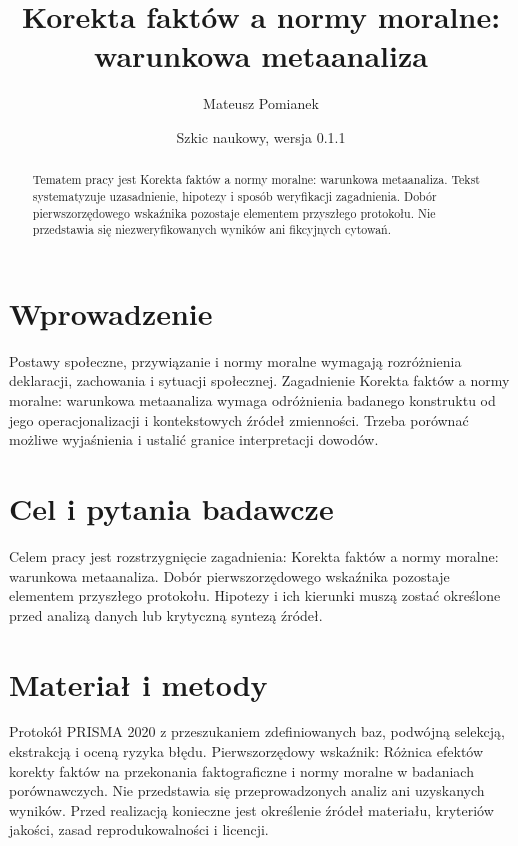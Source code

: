 \documentclass[11pt,a4paper]{article}
\title{Korekta faktów a normy moralne: warunkowa metaanaliza}
\author{Mateusz Pomianek}
\date{Szkic naukowy, wersja 0.1.1}
\begin{document}
\maketitle

\begin{abstract}

Tematem pracy jest Korekta faktów a normy moralne: warunkowa metaanaliza. Tekst systematyzuje uzasadnienie, hipotezy i sposób weryfikacji zagadnienia. Dobór pierwszorzędowego wskaźnika pozostaje elementem przyszłego protokołu. Nie przedstawia się niezweryfikowanych wyników ani fikcyjnych cytowań.

\end{abstract}

\section{Wprowadzenie}

Postawy społeczne, przywiązanie i normy moralne wymagają rozróżnienia deklaracji, zachowania i sytuacji społecznej. Zagadnienie Korekta faktów a normy moralne: warunkowa metaanaliza wymaga odróżnienia badanego konstruktu od jego operacjonalizacji i kontekstowych źródeł zmienności. Trzeba porównać możliwe wyjaśnienia i ustalić granice interpretacji dowodów.

\section{Cel i pytania badawcze}

Celem pracy jest rozstrzygnięcie zagadnienia: Korekta faktów a normy moralne: warunkowa metaanaliza. Dobór pierwszorzędowego wskaźnika pozostaje elementem przyszłego protokołu. Hipotezy i ich kierunki muszą zostać określone przed analizą danych lub krytyczną syntezą źródeł.

\section{Materiał i metody}

Protokół PRISMA 2020 z przeszukaniem zdefiniowanych baz, podwójną selekcją, ekstrakcją i oceną ryzyka błędu. Pierwszorzędowy wskaźnik: Różnica efektów korekty faktów na przekonania faktograficzne i normy moralne w badaniach porównawczych. Nie przedstawia się przeprowadzonych analiz ani uzyskanych wyników. Przed realizacją konieczne jest określenie źródeł materiału, kryteriów jakości, zasad reprodukowalności i licencji.
\end{document}
